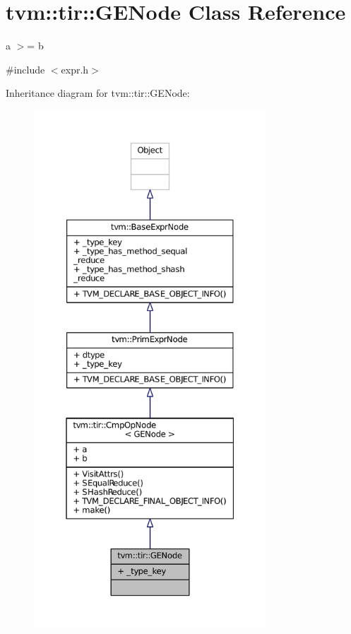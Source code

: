 \hypertarget{classtvm_1_1tir_1_1GENode}{}\section{tvm\+:\+:tir\+:\+:G\+E\+Node Class Reference}
\label{classtvm_1_1tir_1_1GENode}


a $>$= b  




{\ttfamily \#include $<$expr.\+h$>$}



Inheritance diagram for tvm\+:\+:tir\+:\+:G\+E\+Node\+:
\nopagebreak
\begin{figure}[H]
\begin{center}
\leavevmode
\includegraphics[height=550pt]{classtvm_1_1tir_1_1GENode__inherit__graph}
\end{center}
\end{figure}


